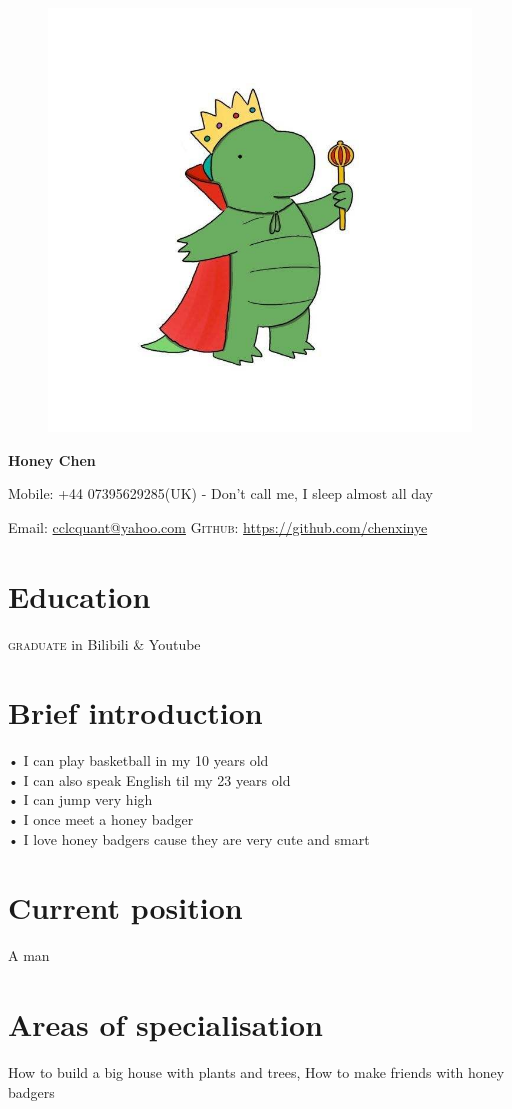\documentclass[11pt]{article}
\begin{document}
\begin{figure}
	\centering
	\includegraphics[width=.5\textwidth]{honey.jpg}
	\label{honey profile} 
\end{figure}


{\LARGE\bfseries Honey Chen}
\bigskip\medskip


Mobile: +44 07395629285(UK) - Don't call me, I sleep almost all day 
\medskip

\medskip
Email: \href{mailto:cclcquant@yahoo.com}{cclcquant@yahoo.com}
\textsc{Github}: \href{https://github.com/chenxinye}{https://github.com/chenxinye}

\section*{Education}
\textsc{graduate} in Bilibili \& Youtube


\section*{Brief introduction}
• I can play basketball in my 10 years old\\
• I can also speak English til my 23 years old\\
• I can jump very high\\
• I once meet a honey badger\\
• I love honey badgers cause they are very cute and smart


\section*{Current position}
A man


\section*{Areas of specialisation}
How to build a big house with plants and trees, How to make friends with honey badgers
\end{document}
